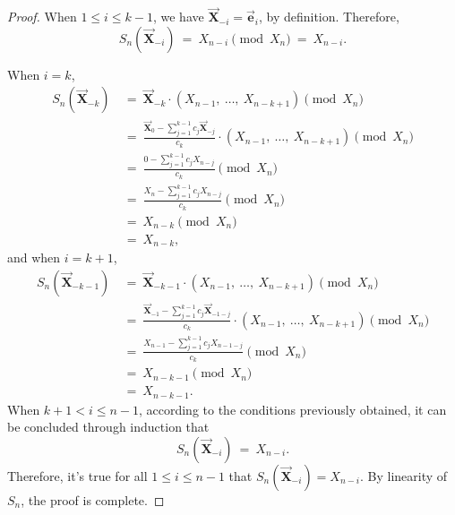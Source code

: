 \documentclass[]{interact}
\newcommand{\vtr}[1]{\vec{\mathbf{#1}}}
\theoremstyle{plain}
\numberwithin{equation}{section} %
\numberwithin{table}{section} %
\numberwithin{figure}{section}
\newcommand{\X}{\vtr{X}}
\begin{document}
\begin{proof}
    When $1 \leq i \leq k - 1$, we have $\vtr{X}_{-i} = \vtr{e}_i$, by definition. Therefore,
    \[S_n(\X_{-i})\ =\ X_{n - i}\pmod{X_n}\ =\ X_{n-i}.\] 
    
    \noindent When $i = k$, 
    \begin{align*}
        S_n(\X_{-k}) &\ =\ \X_{-k}\cdot(X_{n-1},\ \ldots,\ X_{n-k+1})\pmod{X_n} \\
                     &\ =\ \frac{\vtr{X}_{0} - \sum_{j =1}^{k - 1}c_j\vtr{X}_{- j}}{c_k}\cdot(X_{n-1},\ \ldots,\ X_{n-k+1})\pmod{X_n} \\
                     &\ =\ \frac{0 - \sum_{j =1}^{k - 1}c_jX_{n- j}}{c_k}\pmod{X_n} \\
                     &\ =\ \frac{X_{n} - \sum_{j =1}^{k - 1}c_jX_{n- j}}{c_k}\pmod{X_n} \\
                     &\ =\ X_{n-k}\pmod{X_n}\\
                     &\ =\ X_{n-k}, 
    \end{align*}
 and when $i = k+1$,
    \begin{align*}
        S_n(\X_{-k-1}) &\ =\ \X_{-k-1}\cdot(X_{n-1},\ \ldots,\ X_{n-k+1})\pmod{X_n} \\
                     &\ =\ \frac{\vtr{X}_{-1} - \sum_{j =1}^{k - 1}c_j\vtr{X}_{-1-j}}{c_k}\cdot(X_{n-1},\ \ldots,\ X_{n-k+1})\pmod{X_n} \\
                     &\ =\ \frac{X_{n-1} - \sum_{j =1}^{k - 1}c_jX_{n-1-j}}{c_k}\pmod{X_n} \\
                     &\ =\ X_{n-k-1}\pmod{X_n}\\
                     &\ =\ X_{n-k-1}. 
    \end{align*}
 When $k+1 < i \leq n-1$, according to the conditions previously obtained, it can be concluded through induction that
    \[S_n(\X_{-i})\ =\ X_{n - i}.\]
    Therefore, it's true for all $1 \leq i \leq n-1$ that $S_n(\X_{-i}) = X_{n - i}$. By linearity of $S_n$, the proof is complete.
\end{proof}
\end{document}

